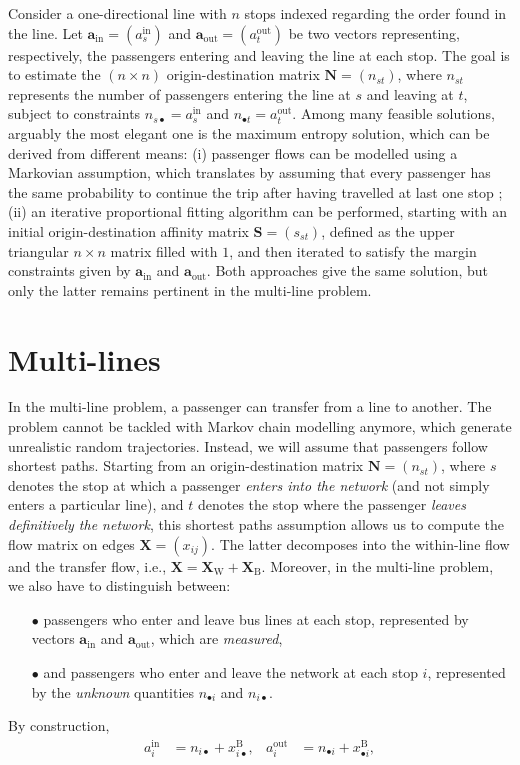 \documentclass{bmcart}
\begin{document}
Consider a one-directional line with $n$ stops indexed regarding the order found in the line.  Let $\mathbf{a}_\text{in} = (a_{s}^\text{in})$ and $\mathbf{a}_\text{out} = (a_{t}^\text{out})$ be two vectors representing, respectively, the passengers entering and leaving the line at each stop. The goal is to estimate the $(n \times n)$ origin-destination matrix $\mathbf{N} = (n_{st})$, where $n_{st}$ represents the number of passengers entering the line at $s$ and leaving at $t$, subject to constraints $n_{s\bullet} = a^\text{in}_s$ and $n_{\bullet t} = a^\text{out}_t$.  Among many feasible solutions, arguably the most elegant one is the maximum entropy solution, which can be derived  from different means:  (i) passenger flows can be modelled using a Markovian assumption, which translates by assuming that every passenger has the same probability to continue the trip after having travelled at last one stop ; (ii) an iterative proportional fitting algorithm can be performed, starting with an initial origin-destination affinity matrix $\mathbf{S} = (s_{st})$, defined as the upper triangular $n\times n$ matrix filled with $1$, and then iterated to satisfy the margin constraints given by $\mathbf{a}_\text{in}$ and $\mathbf{a}_\text{out}$. Both approaches give the same solution, but only the latter remains pertinent in the multi-line problem.

%
\section{Multi-lines}
%

In the multi-line problem, a passenger can transfer from a line to another. The problem cannot be tackled with Markov chain modelling anymore, which generate unrealistic random trajectories. Instead, we will assume that passengers follow shortest paths. Starting from an origin-destination matrix $\mathbf{N} = (n_{st})$, where $s$ denotes the stop at which a passenger \emph{enters into the network} (and not simply enters a particular line), and $t$ denotes the stop where the passenger \emph{leaves definitively the network}, this shortest paths assumption allows us to compute the flow matrix on edges $\mathbf{X} = (x_{ij})$. The latter decomposes into the within-line flow and the transfer flow, i.e., $\mathbf{X}=\mathbf{X}_\text{W}+\mathbf{X}_\text{B}$. 
Moreover, in the multi-line problem, we also have to distinguish between:
\begin{itemize}
	\item[$\bullet$]  passengers who enter and leave bus lines at each stop, represented by vectors $\mathbf{a}_\text{in}$ and $\mathbf{a}_\text{out}$, which are \emph{measured},
	\item[$\bullet$] and passengers who enter and leave the network at each stop $i$, represented by the \emph{unknown} quantities $n_{\bullet i}$ and $n_{i \bullet}$.
\end{itemize}
By construction, 
\begin{align}
		a^\text{in}_i &=n_{i\bullet} + x^\text{B}_{i\bullet},  &
		a^\text{out}_i &= n_{\bullet i} + x^\text{B}_{\bullet i},
\end{align}
\end{document}
